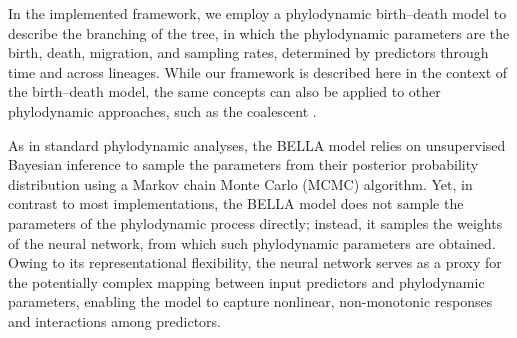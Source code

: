 In the implemented framework, we employ a phylodynamic birth–death model \cite{stadler2010sampling} to describe the branching of the tree, in which the phylodynamic parameters are the birth, death, migration, and sampling rates, determined by predictors through time and across lineages.
While our framework is described here in the context of the birth--death model, the same concepts can also be applied to other phylodynamic approaches, such as the coalescent \cite{kingman1982coalescent}.

As in standard phylodynamic analyses, the BELLA model relies on unsupervised Bayesian inference to sample the parameters from their posterior probability distribution using a Markov chain Monte Carlo (MCMC) algorithm.
Yet, in contrast to most implementations, the BELLA model does not sample the parameters of the phylodynamic process directly; instead, it samples the weights of the neural network, from which such phylodynamic parameters are obtained.
Owing to its representational flexibility, the neural network serves as a proxy for the potentially complex mapping between input predictors and phylodynamic parameters, enabling the model to capture nonlinear, non-monotonic responses and interactions among predictors.
